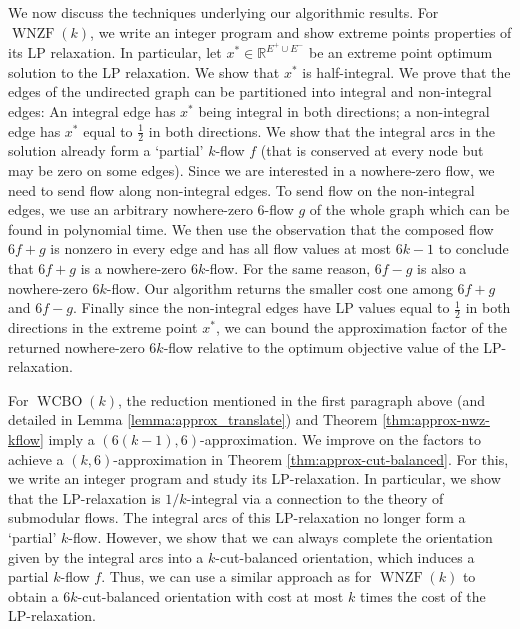 \documentclass[11pt]{article}
\begin{document}
We now discuss the techniques underlying our algorithmic results. For $\operatorname{WNZF}(k)$, we write an integer program and show extreme points properties of its LP relaxation. In particular, let $x^*\in \mathbb{R}^{E^+\cup E^-}$ be an extreme point optimum solution to the LP relaxation. We show that $x^*$ is half-integral. We prove that the edges of the undirected graph can be partitioned into integral and non-integral edges: An integral edge has $x^*$ being integral in both directions; a non-integral edge has $x^*$ equal to $\frac{1}{2}$ in both directions. We show that the integral arcs in the solution already form a `partial' $k$-flow $f$ (that is conserved at every node but may be zero on some edges). Since we are interested in a nowhere-zero flow, we need to send flow along non-integral edges. 
To send flow on the non-integral edges, we use an arbitrary nowhere-zero $6$-flow $g$ of the whole graph which can be found in polynomial time. We then use the observation that the composed flow $6f+g$ is nonzero in every edge and has all flow values at most $6k-1$ to conclude that $6f+g$ is a nowhere-zero $6k$-flow. For the same reason, $6f-g$ is also a nowhere-zero $6k$-flow. Our algorithm returns the smaller cost one among $6f+g$ and $6f-g$. Finally since the non-integral edges have LP values equal to $\frac{1}{2}$ in both directions in the extreme point $x^*$, we can bound the approximation factor of the returned nowhere-zero $6k$-flow relative to the optimum objective value of the LP-relaxation.


For $\operatorname{WCBO}(k)$, the reduction mentioned in the first paragraph above (and detailed in Lemma \ref{lemma:approx_translate}) and Theorem \ref{thm:approx-nwz-kflow} imply a $(6(k-1),6)$-approximation. We improve on the factors to achieve a $(k,6)$-approximation in Theorem \ref{thm:approx-cut-balanced}. For this, 
we write an integer program and study its LP-relaxation. In particular, we show that the LP-relaxation is $1/k$-integral via a connection to the theory of submodular flows. The integral arcs of this LP-relaxation no longer form a `partial' $k$-flow. However, we show that we can always complete the orientation given by the integral arcs into a $k$-cut-balanced orientation, which induces a partial $k$-flow $f$. Thus, we can use a similar approach as for $\operatorname{WNZF}(k)$ to obtain a $6k$-cut-balanced orientation with cost at most $k$ times the cost of the LP-relaxation.
\end{document}
